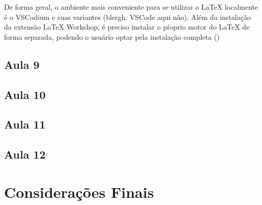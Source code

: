 \documentclass[12pt, a4paper, twocolumn] {article} %
\begin{document}
De forma geral, o ambiente mais conveniente para se utilizar o LaTeX localmente é o VSCodium e suas variantes (blergh, VSCode aqui não). Além da instalação da extensão LaTeX Workshop, é preciso instalar o pŕoprio motor do LaTeX de forma separada, podendo o usuário optar pela instalação completa ()

\subsection{Aula 9}
\lipsum[1-2]

\subsection{Aula 10}
\lipsum[1]

\subsection{Aula 11}
\lipsum[1-2]

\subsection{Aula 12}
\lipsum[1]

\section{Considerações Finais}
\lipsum[1]




\end{document}
